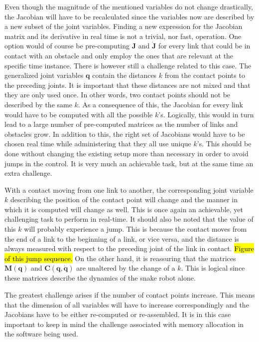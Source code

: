 Even though the magnitude of the mentioned variables do not change drastically, the Jacobian will have to be recalculated since the variables now are described by a new subset of the joint variables. Finding a new expression for the Jacobian matrix and its derivative in real time is not a trivial, nor fast, operation. One option would of course be pre-computing $\mathbf{J}$ and $\dot{\mathbf{J}}$ for every link that could be in contact with an obstacle and only employ the ones that are relevant at the specific time instance. There is however still a challenge related to this case. The generalized joint variables $\mathbf{q}$ contain the distances $k$ from the contact points to the preceding joints. It is important that these distances are not mixed and that they are only used once. In other words, two contact points should not be described by the same $k$. As a consequence of this, the Jacobian for every link would have to be computed with all the possible $k$'s. Logically, this would in turn lead to a large number of pre-computed matrices as the number of links and obstacles grow. In addition to this, the right set of Jacobians would have to be chosen real time while administering that they all use unique $k$'s. This should be done without changing the existing setup more than necessary in order to avoid jumps in the control. It is very much an achievable task, but at the same time an extra challenge.

With a contact moving from one link to another, the corresponding joint variable $k$ describing the position of the contact point will change and the manner in which it is computed will change as well. This is once again an achievable, yet challenging task to perform in real-time. It should also be noted that the value of this $k$ will probably experience a jump. This is because the contact moves from the end of a link to the beginning of a link, or vice versa, and the distance is always measured with respect to the preceding joint of the link in contact. \hl{Figure of this jump sequence.} On the other hand, it is reassuring that the matrices $\mathbf{M(q)}$ and $\mathbf{C(q,\dot{q})}$ are unaltered by the change of a $k$. This is logical since these matrices describe the dynamics of the snake robot alone.

The greatest challenge arises if the number of contact points increase. This means that the dimension of all variables will have to increase correspondingly and the Jacobians have to be either re-computed or re-assembled. It is in this case important to keep in mind the challenge associated with memory allocation in the software being used.



